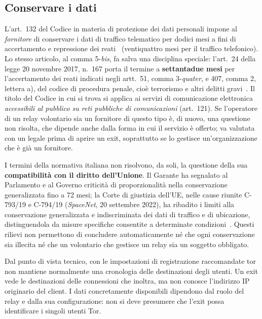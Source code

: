 \subsection{Conservare i dati}

L'art.~132 del Codice in materia di protezione dei dati personali impone al \emph{fornitore} di conservare i dati di traffico telematico per dodici mesi a fini di accertamento e repressione dei reati~\cite{codiceprivacy} (ventiquattro mesi per il traffico telefonico). Lo stesso articolo, al comma 5-\emph{bis}, fa salva una disciplina speciale: l'art.~24 della legge 20 novembre 2017, n.~167 porta il termine a \textbf{settantadue mesi} per l'accertamento dei reati indicati negli artt.~51, comma 3-\emph{quater}, e 407, comma 2, lettera a), del codice di procedura penale, cioè terrorismo e altri delitti gravi~\cite{legge167}. Il titolo del Codice in cui si trova si applica ai servizi di comunicazione elettronica \emph{accessibili al pubblico su reti pubbliche di comunicazioni} (art.~121). Se l'operatore di un relay volontario sia un fornitore di questo tipo è, di nuovo, una questione non risolta, che dipende anche dalla forma in cui il servizio è offerto; va valutata con un legale prima di aprire un exit, soprattutto se lo gestisce un'organizzazione che è già un fornitore.

I termini della normativa italiana non risolvono, da soli, la questione della sua
\textbf{compatibilità con il diritto dell'Unione}. Il Garante ha segnalato al
Parlamento e al Governo criticità di proporzionalità nella conservazione
generalizzata fino a 72 mesi; la Corte di giustizia dell'UE, nelle cause riunite
C-793/19 e C-794/19 (\emph{SpaceNet}, 20 settembre 2022), ha ribadito i limiti
alla conservazione generalizzata e indiscriminata dei dati di traffico e di
ubicazione, distinguendola da misure specifiche consentite a determinate
condizioni~\cite{garante2021retention,spacenet2022}. Questi rilievi non
permettono di concludere automaticamente né che ogni conservazione sia illecita
né che un volontario che gestisce un relay sia un soggetto obbligato.

Dal punto di vista tecnico, con le impostazioni di registrazione raccomandate tor non mantiene normalmente una cronologia delle destinazioni degli utenti. Un exit vede le destinazioni delle connessioni che inoltra, ma non conosce l'indirizzo IP originario del client. I dati concretamente disponibili dipendono dal ruolo del relay e dalla sua configurazione: non si deve presumere che l'exit possa identificare i singoli utenti Tor.


